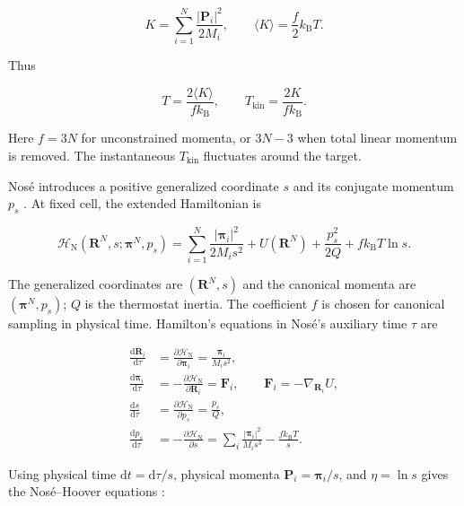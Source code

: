 \documentclass[12pt,a4paper]{article}
\numberwithin{equation}{section}
\begin{document}
\begin{equation}
  K=\sum_{i=1}^{N}\frac{|\bm P_i|^2}{2M_i},\qquad
  \langle K\rangle=\frac{f}{2}k_{\mathrm B}T.
  \label{eq:kinetic-temperature}
\end{equation}

Thus

\begin{equation}
  T=\frac{2\langle K\rangle}{f k_{\mathrm B}},\qquad
  T_{\mathrm{kin}}=\frac{2K}{f k_{\mathrm B}}.
  \label{eq:temperature-definition}
\end{equation}

Here $f=3N$ for unconstrained momenta, or $3N-3$ when total linear
momentum is removed. The instantaneous $T_{\mathrm{kin}}$ fluctuates
around the target.

Nos\'e introduces a positive generalized coordinate $s$ and its conjugate
momentum $p_s$ \cite{nose1984}. At fixed cell, the extended Hamiltonian is

\begin{equation}
  \mathcal H_{\mathrm{N}}(\bm R^N,s;\bm\pi^N,p_s)
    =\sum_{i=1}^{N}\frac{|\bm\pi_i|^2}{2M_i s^2}
      +U(\bm R^N)+\frac{p_s^2}{2Q}+f k_{\mathrm B}T\ln s.
  \label{eq:nose-hoover-hamiltonian}
\end{equation}

The generalized coordinates are $(\bm R^N,s)$ and the canonical momenta
are $(\bm\pi^N,p_s)$; $Q$ is the thermostat inertia. The coefficient
$f$ is chosen for canonical sampling in physical time. Hamilton's
equations in Nos\'e's auxiliary time $\tau$ are

\begin{align}
  \frac{\mathrm d\bm R_i}{\mathrm d\tau}
    &=\frac{\partial\mathcal H_{\mathrm N}}{\partial\bm\pi_i}
      =\frac{\bm\pi_i}{M_i s^2},\\
  \frac{\mathrm d\bm\pi_i}{\mathrm d\tau}
    &=-\frac{\partial\mathcal H_{\mathrm N}}{\partial\bm R_i}
      =\bm F_i,\qquad \bm F_i=-\nabla_{\bm R_i}U,\\
  \frac{\mathrm ds}{\mathrm d\tau}
    &=\frac{\partial\mathcal H_{\mathrm N}}{\partial p_s}
      =\frac{p_s}{Q},\\
  \frac{\mathrm dp_s}{\mathrm d\tau}
    &=-\frac{\partial\mathcal H_{\mathrm N}}{\partial s}
      =\sum_i\frac{|\bm\pi_i|^2}{M_i s^3}
        -\frac{f k_{\mathrm B}T}{s}.
  \label{eq:nose-hamilton-equations}
\end{align}

Using physical time $\mathrm dt=\mathrm d\tau/s$, physical momenta
$\bm P_i=\bm\pi_i/s$, and $\eta=\ln s$ gives the Nos\'e--Hoover equations
\cite{hoover1985}:
\end{document}
